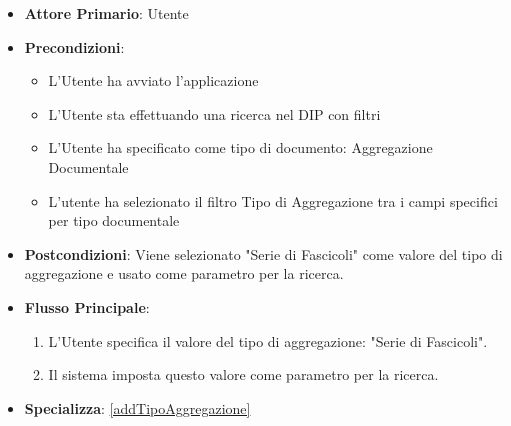 \begin{itemize}
      \item \textbf{Attore Primario}: Utente
      \item \textbf{Precondizioni}: 
      \begin{itemize}
            \item L'Utente ha avviato l'applicazione
            \item L'Utente sta effettuando una ricerca nel DIP con filtri
            \item L'Utente ha specificato come tipo di documento: Aggregazione Documentale
            \item L'utente ha selezionato il filtro Tipo di Aggregazione tra i campi specifici per tipo documentale
      \end{itemize}
      \item \textbf{Postcondizioni}: Viene selezionato "Serie di Fascicoli" come valore del tipo di aggregazione e usato come parametro per la ricerca.
      \item \textbf{Flusso Principale}:
      \begin{enumerate}
            \item L'Utente specifica il valore del tipo di aggregazione: "Serie di Fascicoli".
            \item Il sistema imposta questo valore come parametro per la ricerca.
      \end{enumerate}
      \item \textbf{Specializza}: \ref{addTipoAggregazione}
\end{itemize}

